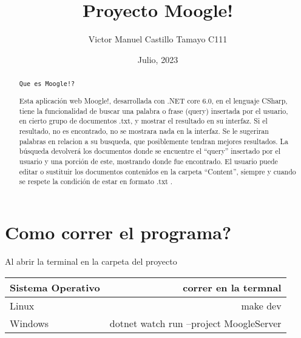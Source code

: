 \documentclass[a4paper, 12pt]{article}
\author{Victor Manuel Castillo Tamayo C111}
\title{Proyecto Moogle!}
\date{Julio, 2023}
\begin{document}
	\maketitle
\begin{abstract}
		\begin{center}
			\large\texttt{Que es Moogle!?}
		\end{center}
		Esta aplicación web Moogle!, desarrollada con .NET core 6.0, en el lenguaje CSharp, tiene la funcionalidad de buscar una palabra o frase (query) insertada por el usuario, en cierto grupo de documentos .txt, y mostrar el resultado en su interfaz. Si el resultado, no es encontrado, no se mostrara nada en la interfaz. Se le sugeriran palabras en relacion a su busqueda, que posiblemente tendran mejores resultados. La búsqueda devolverá los documentos donde se encuentre el “query” insertado por el usuario y una porción de este, mostrando donde fue encontrado. El usuario puede editar o sustituir los documentos contenidos en la carpeta “Content”, siempre y cuando se respete la condición de estar en formato .txt .
	\end{abstract}
\section{Como correr el programa?}
		Al abrir la terminal en la carpeta del proyecto
		\begin{center}
		\begin{tabular}{l|r}
		Sistema Operativo & correr en la termnal\\
		\hline
		Linux & make dev\\
		Windows & dotnet watch run --project MoogleServer\\
		\end{tabular}
		\end{center}
\end{document}
